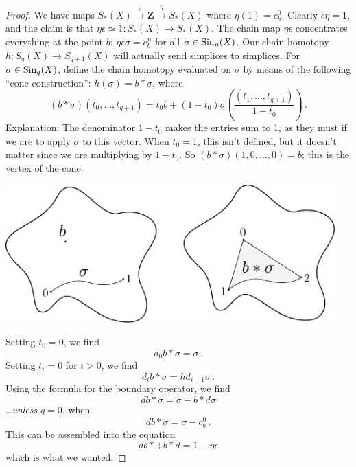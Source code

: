 		\begin{proof}
		We have maps $S_\ast(X)\xrightarrow{\epsilon}\mathbf{Z}\xrightarrow{\eta}S_\ast(X)$ where $\eta(1)=c_b^0$. Clearly $\epsilon\eta=1$, and the claim is that $\eta\epsilon\simeq1:S_\ast(X)\to S_\ast(X)$. The chain map 
$\eta\epsilon$ concentrates everything at the point $b$: 
$\eta\epsilon\sigma=c_b^n$ for all $\sigma\in\mathrm{Sin}_n(X)$. 
Our chain homotopy $h:S_q(X)\to S_{q+1}(X)$ will actually send simplices to simplices. For $\sigma\in\mathrm{Sin}_q(X)$, define the chain homotopy evaluated on $\sigma$ by means of the following ``cone construction'': $h(\sigma)=b*\sigma$, where
\[
(b*\sigma)(t_0,\ldots,t_{q+1})=t_0b+(1-t_0)\sigma\left(\frac{(t_1,\ldots,t_{q+1})}{1-t_0}\right)\,.
\]
Explanation: The denominator $1-t_0$ makes the entries sum to 1, as they must if we are to apply $\sigma$ to this vector. When $t_0=1$, this isn't defined, but it doesn't matter since we are multiplying by $1-t_0$. So
$(b*\sigma)(1,0,\ldots,0)=b$; this is the vertex of the cone. 

\begin{center}
\includegraphics[width=5in]{905/Figures/05-homotopy.pdf}
\end{center}

Setting $t_0=0$, we find
\[
d_0b*\sigma=\sigma\,.
\]
Setting $t_i=0$ for $i>0$, we find
\[
d_ib*\sigma=hd_{i-1}\sigma\,.
\]
Using the formula for the boundary operator, we find
\[
db*\sigma=\sigma-b*d\sigma
\]
\ldots {\em unless} $q=0$, when 
\[
db*\sigma=\sigma-c_b^0\,.
\]
This can be assembled into the equation
\[
db*+b*d=1-\eta\epsilon
\]
which is what we wanted. 		
\end{proof}




